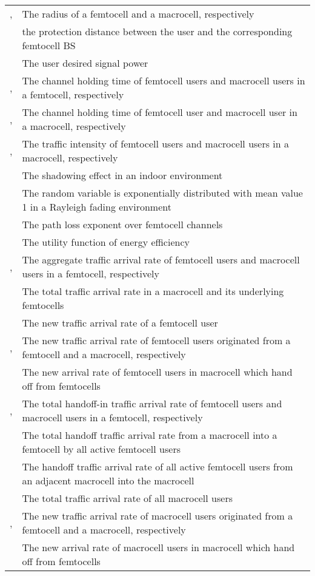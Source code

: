 \documentclass[10pt,final,journal,letterpaper,twoside,twocolumn]{IEEEtran}
\begin{document}
\begin{table*}[htbp]
\begin{tabular}{l|l}
,  & The radius of a femtocell and a macrocell, respectively \\
 & the protection distance between the user and the corresponding femtocell BS \\
 & The user desired signal power \\
,  & The channel holding time of femtocell users and macrocell users in a femtocell, respectively \\
,  & The channel holding time of femtocell user and macrocell user in a macrocell, respectively \\
,  & The traffic intensity of femtocell users and macrocell users in a macrocell, respectively \\
 & The shadowing effect in an indoor environment \\
 & The random variable is exponentially distributed with mean value 1 in a Rayleigh fading environment \\
 & The path loss exponent over femtocell channels \\
 & The utility function of energy efficiency \\
,  & The aggregate traffic arrival rate of femtocell users and macrocell users in a femtocell, respectively \\
 & The total traffic arrival rate in a macrocell and its underlying  femtocells \\
 & The new traffic arrival rate of a femtocell user \\
,  & The new traffic arrival rate of femtocell users originated from a femtocell and a macrocell, respectively \\
 & The new arrival rate of femtocell users in macrocell which hand off from femtocells  \\
,  & The total handoff-in traffic arrival rate of femtocell users and macrocell users in a femtocell, respectively \\
 & The total handoff traffic arrival rate from a macrocell into a femtocell by all active femtocell users \\
 & The handoff traffic arrival rate of all active femtocell users from an adjacent macrocell into the macrocell \\
 & The total traffic arrival rate of all macrocell users \\
,  & The new traffic arrival rate of macrocell users originated from a femtocell and a macrocell, respectively \\
 & The new arrival rate of macrocell users in macrocell which hand off from femtocells \\

\end{tabular}
\end{table*}
\end{document}
